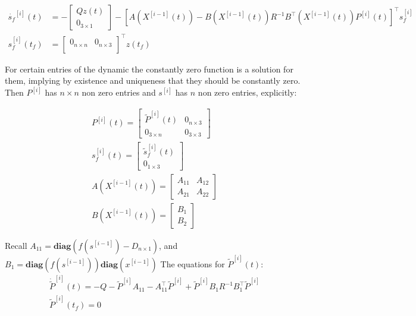 \documentclass[3p,times]{article}
\newcommand{\diag}{\textbf{diag}}
\begin{document}
\begin{align}
\dot{s_f}^{[i]}(t) &= -\begin{bmatrix}Qz(t) \\ 0_{3\times 1} \end{bmatrix}- \left[A\left(X^{[i-1]}(t)\right) -B\left(X^{[i-1]}(t)\right)R^{-1}B^\top \left(X^{[i-1]}(t)\right)P^{[i]}(t) \right]^\top s_f^{[i]} \\
s_f^{[i]}(t_f) &=   \begin{bmatrix}
0_{n\times n}  & 0_{n\times 3} \\
\end{bmatrix}^\top z(t_f)
\end{align}

For certain entries of the dynamic the constantly zero function is a solution for them, implying by existence and uniqueness that they should be constantly zero. Then $P^{[i]}$ has $n\times n$ non zero entries and $s^{[i]}$ has $n$ non zero entries, explicitly:

\begin{align}
P^{[i]}(t) = \begin{bmatrix}
\tilde{P}^{[i]}(t) & 0_{n\times 3} \\ 0_{3 \times n} & 0_{3 \times 3}
\end{bmatrix} \\
s_f^{[i]}(t) = \begin{bmatrix}
\tilde{s}_f^{[i]}(t) \\ 0_{1\times 3}
\end{bmatrix} \\
A\left (X^{[i-1]}(t)\right) = \begin{bmatrix}
A_{11} & A_{12} \\ A_{21} & A_{22}
\end{bmatrix} \\
B\left (X^{[i-1]}(t)\right) = \begin{bmatrix}
B_1 \\ B_2
\end{bmatrix} 
\end{align}


Recall $A_{11} = \diag \left( f\left(s^{[i-1]}\right)- D_{n\times 1} \right)$, and $B_1 = \diag\left(f\left(s^{[i-1]}\right)\right)\diag \left(x^{[i-1]} \right) $ The equations for $\tilde{P}^{[i]}(t)$:
\begin{align}
\dot{\tilde{P}}^{[i]}(t)= -Q- \tilde{P}^{[i]}A_{11} -A_{11}^\top \tilde{P}^{[i]} +  \tilde{P}^{[i]}B_1R^{-1}B_1^\top \tilde{P}^{[i]} \\
\tilde{P}^{[i]}(t_f) = 0
\end{align}
\end{document}
